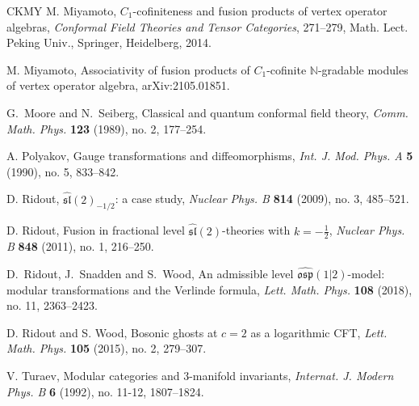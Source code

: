 \documentclass[11pt, reqno]{amsart}
\theoremstyle{definition}\newtheorem{defi}[thm]{Definition}
\theoremstyle{definition}\newtheorem{rem}[thm]{Remark}
\theoremstyle{definition}\newtheorem{exam}[thm]{Example}
\theoremstyle{definition}\newtheorem{assum}[thm]{Assumption}
\newcommand{\NN}{\mathbb{N}}
\begin{document}
\begin{thebibliography}{CKMY}
M. Miyamoto, $C_1$-cofiniteness and fusion products of vertex operator algebras, \textit{Conformal Field Theories and Tensor Categories}, 271--279, Math. Lect. Peking Univ., Springer, Heidelberg, 2014.

M. Miyamoto, Associativity of fusion products of $C_1$-cofinite $\NN$-gradable modules of vertex operator algebra, arXiv:2105.01851.

G.~Moore and N.~Seiberg, Classical and quantum conformal field theory, \textit{Comm. Math. Phys.} \textbf{123} (1989), no. 2, 177--254.

 A. Polyakov, Gauge transformations and diffeomorphisms, \textit{Int. J. Mod. Phys. A} \textbf{5} (1990), no. 5, 833--842.

D. Ridout, $\widehat{\mathfrak{sl}}(2)_{-1/2}$: a case study, \textit{Nuclear Phys. B} \textbf{814} (2009), no. 3, 485--521.

D. Ridout, Fusion in fractional level $\widehat{\mathfrak{sl}}(2)$-theories with $k=-\frac{1}{2}$, \textit{Nuclear Phys. B} \textbf{848} (2011), no. 1, 216--250.  

D.~Ridout, J.~Snadden and S.~Wood,
An admissible level $\widehat{\mathfrak{osp}}( 1\vert 2)$-model: modular transformations and the Verlinde formula,
\textit{Lett. Math. Phys.} \textbf{108} (2018), no. 11, 2363--2423. 

D. Ridout and S. Wood, Bosonic ghosts at $c=2$ as a logarithmic CFT,
\textit{Lett. Math. Phys.} \textbf{105} (2015), no. 2, 279--307. 

V. Turaev, Modular categories and $3$-manifold invariants, \textit{Internat. J. Modern Phys. B} \textbf{6} (1992), no. 11-12, 1807--1824. 

\end{thebibliography}
\end{document}
